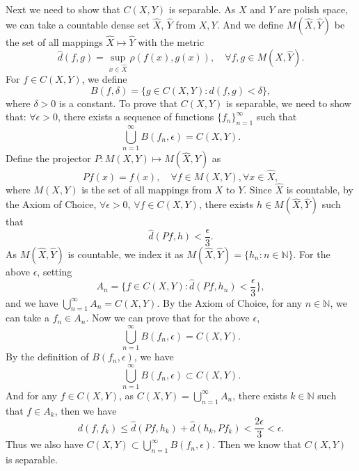 \documentclass[12pt,a4paper]{ctexart}
\begin{document}
Next we need to show that $C(X, Y)$ is separable. As $X$ and $Y$ are polish space, we can take a countable dense set $\hat{X}$, $\hat{Y}$ from $X, Y$. And we define $M(\hat X, \hat Y)$ be the set of all mappings $\hat X \mapsto \hat Y$ with the metric
\begin{equation*}
    \hat d (f, g) = \sup_{x \in \hat X} \rho(f(x), g(x)), \quad \forall f, g \in M(\hat X, \hat Y).
\end{equation*}
For $f \in C(X, Y)$, we define
\begin{equation*}
    B(f, \delta) = \{g \in C(X, Y): d(f, g) < \delta \},
\end{equation*}
where $\delta > 0$ is a constant. To prove that $C(X, Y)$ is separable, we need to show that: $\forall \epsilon > 0$, there exists a sequence of functions $\{f_{n}\}_{n = 1}^{\infty}$ such that
\begin{equation*}
    \bigcup_{n = 1}^{\infty} B(f_{n}, \epsilon) = C(X, Y).
\end{equation*}
Define the projector $P: M(X, Y) \mapsto M(\hat X, Y)$ as
\begin{equation*}
    P f(x) = f(x), \quad \forall f \in M(X, Y), \forall x \in \hat X,
\end{equation*}
where $M(X, Y)$ is the set of all mappings from $X$ to $Y$. Since $\hat X$ is countable, by the Axiom of Choice, $\forall \epsilon > 0$, $\forall f \in C(X, Y)$, there exists $h \in M(\hat X, \hat Y)$ such that
\begin{equation*}
    \hat{d} (Pf, h) < \frac{\epsilon}{3}.
\end{equation*}
As $M(\hat X, \hat Y)$ is countable, we index it as $M(\hat X, \hat Y) = \{h_{n}: n \in \mathbb{N}\}$. For the above $\epsilon$, setting
\begin{equation*}
    A_{n} = \{f \in C(X, Y): \hat d (Pf, h_{n}) < \frac{\epsilon}{3}\},
\end{equation*}
and we have $\bigcup_{n = 1}^{\infty} A_{n} = C(X, Y)$. By the Axiom of Choice, for any $n \in \mathbb{N}$, we can take a $f_{n} \in A_{n}$. Now we can prove that for the above $\epsilon$, $$\bigcup_{n = 1}^{\infty} B(f_{n}, \epsilon) = C(X, Y).$$
By the definition of $B(f_{n}, \epsilon)$, we have
\begin{equation*}
    \bigcup_{n = 1}^{\infty} B(f_{n}, \epsilon) \subset C(X, Y).
\end{equation*}
And for any $f \in C(X, Y)$, as $C(X, Y) = \bigcup_{n = 1}^{\infty} A_{n}$, there exists $k \in \mathbb{N}$ such that $f \in A_{k}$, then we have
\begin{equation*}
    d(f, f_{k}) \leq \hat d(Pf, h_{k}) + \hat d (h_{k}, P f_{k}) < \frac{2 \epsilon}{3} < \epsilon.
\end{equation*}
Thus we also have $C(X, Y) \subset \bigcup_{n = 1}^{\infty} B(f_{n}, \epsilon)$. Then we know that $C(X, Y)$ is separable.
\vspace{4pt}
\end{document}
